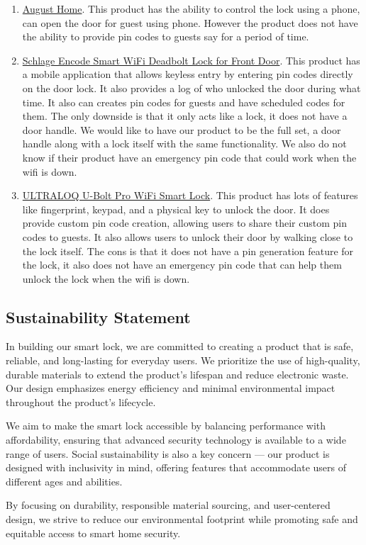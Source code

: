 \begin{enumerate}
    \item \href{https://www.amazon.com/August-Home-Connected-Electronic-%E2%80%8EAUG-SL05-M01-S01/dp/B082VXK9CK?th=1}{August Home}. This product has the ability to control the lock using a phone, can open the door for guest using phone. However the product does not have the ability to provide pin codes to guests say for a period of time.
    \item \href{https://a.co/d/3ruDPmO}{Schlage Encode Smart WiFi Deadbolt Lock for Front Door}. This product has a mobile application that allows keyless entry by entering pin codes directly on the door lock. It also provides a log of who unlocked the door during what time. It also can creates pin codes for guests and have scheduled codes for them. The only downside is that it only acts like a lock, it does not have a door handle. We would like to have our product to be the full set, a door handle along with a lock itself with the same functionality. We also do not know if their product have an emergency pin code that could work when the wifi is down.
    \item \href{https://a.co/d/g1BpVmg}{ULTRALOQ U-Bolt Pro WiFi Smart Lock}. This product has lots of features like fingerprint, keypad, and a physical key to unlock the door. It does provide custom pin code creation, allowing users to share their custom pin codes to guests. It also allows users to unlock their door by walking close to the lock itself. The cons is that it does not have a pin generation feature for the lock, it also does not have an emergency pin code that can help them unlock the lock when the wifi is down.
\end{enumerate}


\subsection{Sustainability Statement}

In building our smart lock, we are committed to creating a product that is safe, reliable, and long-lasting for everyday users. We prioritize the use of high-quality, durable materials to extend the product’s lifespan and reduce electronic waste. Our design emphasizes energy efficiency and minimal environmental impact throughout the product’s lifecycle.

We aim to make the smart lock accessible by balancing performance with affordability, ensuring that advanced security technology is available to a wide range of users. Social sustainability is also a key concern — our product is designed with inclusivity in mind, offering features that accommodate users of different ages and abilities.

By focusing on durability, responsible material sourcing, and user-centered design, we strive to reduce our environmental footprint while promoting safe and equitable access to smart home security.
